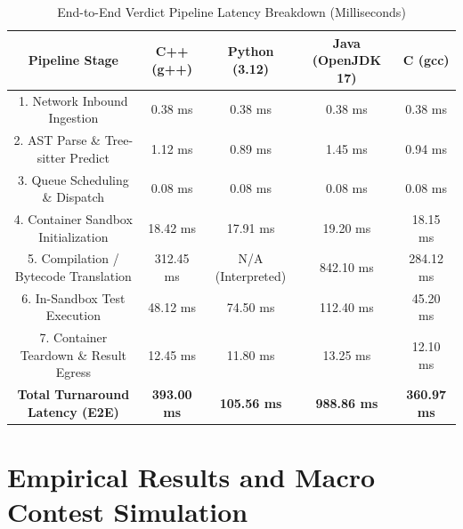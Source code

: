 \documentclass[conference]{IEEEtran}
\begin{document}
\begin{table}[htbp]
\caption{End-to-End Verdict Pipeline Latency Breakdown (Milliseconds)}
\label{tab:e2e_latency}
\begin{center}
\begin{tabular}{|c|c|c|c|c|}
\hline
\textbf{Pipeline Stage} & \textbf{C++ (g++)} & \textbf{Python (3.12)} & \textbf{Java (OpenJDK 17)} & \textbf{C (gcc)} \\
\hline
1. Network Inbound Ingestion & 0.38 ms & 0.38 ms & 0.38 ms & 0.38 ms \\
\hline
2. AST Parse \& Tree-sitter Predict & 1.12 ms & 0.89 ms & 1.45 ms & 0.94 ms \\
\hline
3. Queue Scheduling \& Dispatch & 0.08 ms & 0.08 ms & 0.08 ms & 0.08 ms \\
\hline
4. Container Sandbox Initialization & 18.42 ms & 17.91 ms & 19.20 ms & 18.15 ms \\
\hline
5. Compilation / Bytecode Translation & 312.45 ms & N/A (Interpreted) & 842.10 ms & 284.12 ms \\
\hline
6. In-Sandbox Test Execution & 48.12 ms & 74.50 ms & 112.40 ms & 45.20 ms \\
\hline
7. Container Teardown \& Result Egress & 12.45 ms & 11.80 ms & 13.25 ms & 12.10 ms \\
\hline
\textbf{Total Turnaround Latency (E2E)} & \textbf{393.00 ms} & \textbf{105.56 ms} & \textbf{988.86 ms} & \textbf{360.97 ms} \\
\hline
\end{tabular}
\end{center}
\end{table}

\section{Empirical Results and Macro Contest Simulation}
\end{document}
